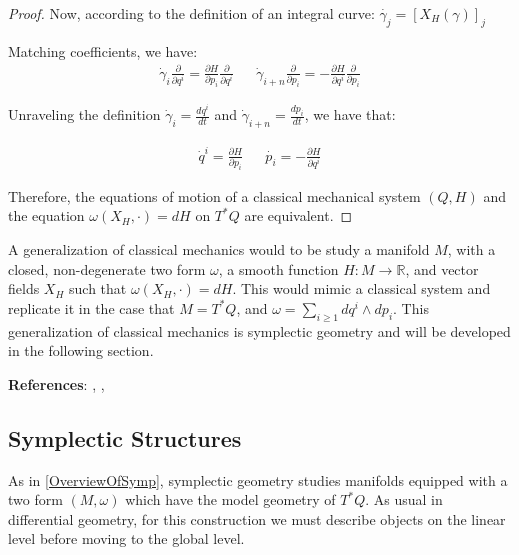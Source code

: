 \begin{proof}
\noindent Now, according to the definition of an integral curve: $\dot{\gamma_{j}} = \left[ X_{H}(\gamma) \right]_{j}$

\noindent Matching coefficients, we have:
\begin{align}
\dot{\gamma}_{i} \frac{\partial}{\partial q^{i}} = \frac{\partial H}{\partial p_{i}} \frac{\partial}{\partial q^{i}} && \dot{\gamma}_{i+n} \frac{\partial}{\partial p_{i}} = -\frac{\partial H}{\partial q^{i}} \frac{\partial}{\partial p_{i}}
\end{align}

\noindent Unraveling the definition $\dot{\gamma}_{i} = \frac{dq^{i}}{dt}$ and $\dot{\gamma}_{i+n} = \frac{dp_{i}}{dt}$, we have that: 

\begin{align}
\dot{q}^{i} = \frac{\partial H}{\partial p_{i}} && \dot{p_{i}}  = -\frac{\partial H}{\partial q^{i}} 
\end{align}

\noindent Therefore, the equations of motion of a classical mechanical system $(Q, H)$ and the equation $\omega(X_{H}, \cdot) = dH$ on $T^{*} Q$ are equivalent.
\end{proof}

\begin{remark}
\label{OverviewOfSymp}
A generalization of classical mechanics would to be study a manifold $M$, with a closed, non-degenerate two form $\omega$, a smooth function $H: M \to \mathbb{R}$, and vector fields $X_{H}$ such that $\omega(X_{H}, \cdot) = dH$. This would mimic a classical system and replicate it in the case that $M = T^{*} Q$, and $\omega = \sum_{i \geq 1} dq^{i} \wedge dp_{i}$. This generalization of classical mechanics is symplectic geometry and will be developed in the following section. 
\end{remark}

\noindent \textbf{References}: \textcite{Bjorn2018}, \textcite{Terek2020}, \textcite{Arnold2010}

\subsection{Symplectic Structures}
As in \ref{OverviewOfSymp}, symplectic geometry studies manifolds equipped with a two form $(M, \omega)$ which have the model geometry of $T^{*} Q$. As usual in differential geometry, for this construction we must describe objects on the linear level before moving to the global level.  

